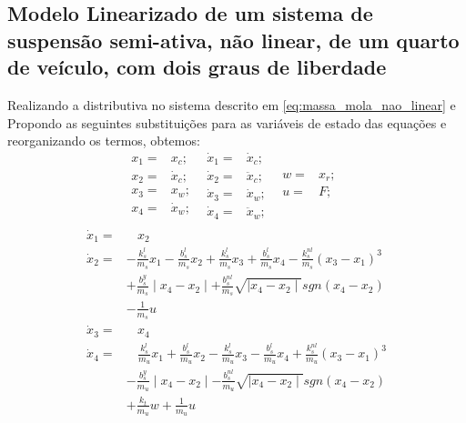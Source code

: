\documentclass[a4paper]{ifacconf}
\begin{document}
    \subsection{Modelo Linearizado de um sistema de suspensão semi-ativa, não linear, de um quarto de veículo, com dois graus de liberdade }
    Realizando a distributiva no sistema descrito em \ref{eq:massa_mola_nao_linear} e Propondo as seguintes substituições para as variáveis de estado das equações e reorganizando os termos, obtemos: 
    \begin{equation*}
        \begin{split}
            x_{1}=&x_{c};\ \ \\
            x_{2}=&\dot{x}_{c};\ \ \\
            x_{3}=&x_{w};\ \ \\
            x_{4}=&\dot{x}_{w};\ \ \\
        \end{split}
        \begin{split}
            \dot{x}_{1}=&\dot{x}_{c};\ \ \\
            \dot{x}_{2}=&\ddot{x}_{c};\ \ \\
            \dot{x}_{3}=&\dot{x}_{w};\ \ \\
            \dot{x}_{4}=&\ddot{x}_{w};\ \ \\
        \end{split}
        \begin{split}
            w=&x_{r};\ \ \\
            u=&F;\ \ \\
        \end{split} 
    \end{equation*}
    \begin{equation} \label{eq:massa_mola_nao_linear}
        \begin{aligned}
        \dot{x}_{1}=&\ \ \ \ x_{2}\\
        \dot{x}_{2}=&-\frac{k^l_s}{m_s}x_1-\frac{b^l_s}{m_s}x_2+\frac{k^l_s}{m_s}x_3+\frac{b^l_s}{m_s}x_4-\frac{k^{nl}_s}{m_s}(x_3-x_1)^3\\
                    &+\frac{b^y_s}{m_s}\mid x_4-x_2\mid+\frac{b^{nl}_s}{m_s}\sqrt{\mid x_4-x_2\mid}sgn(x_4-x_2)\\
                    &-\frac{1}{m_s}u\\
        \dot{x}_{3}=&\ \ \ \ x_{4}\\
        \dot{x}_{4}=&\ \ \ \ \frac{k^l_s}{m_u}x_1+\frac{b^l_s}{m_u}x_2-\frac{k^l_s}{m_u}x_3-\frac{b^l_s}{m_u}x_4+\frac{k^{nl}_s}{m_u}(x_3-x_1)^3\\
                    &-\frac{b^y_s}{m_u}\mid x_4-x_2\mid-\frac{b^{nl}_s}{m_u}\sqrt{\mid x_4-x_2\mid}sgn(x_4-x_2)\\
                    &+\frac{k_t}{m_u}w+\frac{1}{m_u}u\\
        \end{aligned}
    \end{equation}
\end{document}
